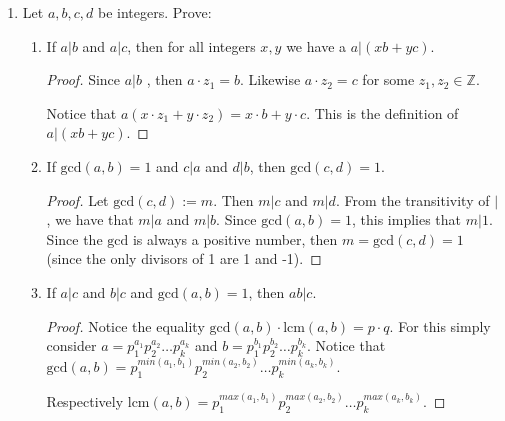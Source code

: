 \documentclass[12pt]{article}
\begin{document}
\begin{enumerate}
\begin{proof}
    By substituting the inclusion exclusion formula we get that $$\vert [m]\setminus (P \cup Q \cup R) \vert = m- qr -pr - pq +r+ q+ p - 1 $$
    $$ = pqr - qr - pr -pq +r + q + p -1 $$
    $$ = q(r(p-1) + 1)-p(r-q + 1) + r-1 $$
    
    \end{proof}
    
    \item Let $a,b,c,d$ be integers. Prove:
        \begin{enumerate}
            \item If $a | b$ and $a | c$, then for all integers $x,y$ we have a $a | (xb+yc).$
            
            \begin{proof}
                Since $a| b$ , then $a \cdot z_1 = b $. Likewise $a\cdot z_2 = c$ for some $z_1, z_2 \in \mathbb Z$.
                
                Notice that $a(x \cdot z_1 + y \cdot z_2) = x\cdot b + y \cdot c $. This is the definition of $a | (xb+yc)$.
            \end{proof}
            
            \item If $\textrm{gcd}(a,b) = 1 $ and $c|a$ and $d|b$, then $\textrm{gcd}(c,d) = 1$.
                \begin{proof}
                     Let $\textrm{gcd}(c,d) := m$. Then $m|c$ and $m|d$. From the transitivity of $|$ , we have that $m | a$ and $ m | b$. Since $\textrm{gcd}(a,b) = 1$, this implies that $m | 1$. Since the $\textrm{gcd}$ is always a positive number, then $m = \textrm{gcd}(c,d) = 1$ (since the only divisors of 1 are 1 and -1).
                    
                \end{proof}
                
            \item If $a | c$ and $ b | c$ and $\textrm{gcd}(a,b) = 1$, then $ab | c$.
                \begin{proof}
                Notice the equality $\textrm{gcd}(a,b) \cdot \textrm{lcm}(a,b) = p \cdot q$. For this simply consider $a = p_1^{a_1} p_2^{a_2} \ldots p_k^{a_k}$ and $b= p_1^{b_1} p_2 ^{b_2} \ldots p_k^{b_k}$. Notice that $\textrm{gcd}(a,b) = p_1^{min(a_1,b_1)} p_2^{min(a_2,b_2)}\ldots p_k^{min(a_k,b_k)}$. 
                
                Respectively $\textrm{lcm}(a,b) = p_1^{max(a_1,b_1)} p_2^{max(a_2,b_2)}\ldots p_k^{max(a_k,b_k)}$.
                

\end{proof}
\end{enumerate}
\end{enumerate}
\end{document}

